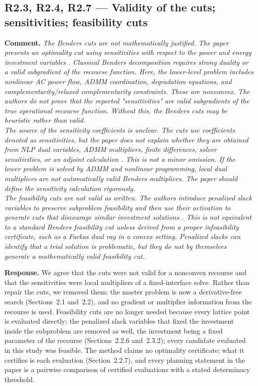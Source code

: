 \documentclass[11pt]{article}
\newcommand{\rcomment}[1]{\par\medskip\noindent\textbf{Comment.} \textit{#1}\par\smallskip}
\newcommand{\rresponse}[1]{\noindent\textbf{Response.} #1\par\smallskip}
\begin{document}
\subsection*{R2.3, R2.4, R2.7 --- Validity of the cuts; sensitivities; feasibility cuts}
\rcomment{
The Benders cuts are not mathematically justified. The paper presents an optimality cut using sensitivities with respect to the power and energy investment variables . Classical Benders decomposition requires strong duality or a valid subgradient of the recourse function. Here, the lower-level problem includes nonlinear AC power flow, ADMM coordination, degradation equations, and complementarity/relaxed complementarity constraints. These are nonconvex. The authors do not prove that the reported "sensitivities" are valid subgradients of the true operational recourse function. Without this, the Benders cuts may be heuristic rather than valid.\\
The source of the sensitivity coefficients is unclear. The cuts use coefficients denoted as sensitivities, but the paper does not explain whether they are obtained from NLP dual variables, ADMM multipliers, finite differences, solver sensitivities, or an adjoint calculation . This is not a minor omission. If the lower problem is solved by ADMM and nonlinear programming, local dual multipliers are not automatically valid Benders multipliers. The paper should define the sensitivity calculation rigorously.\\
The feasibility cuts are not valid as written. The authors introduce penalized slack variables to preserve subproblem feasibility and then use their activation to generate cuts that discourage similar investment solutions . This is not equivalent to a standard Benders feasibility cut unless derived from a proper infeasibility certificate, such as a Farkas dual ray in a convex setting. Penalized slacks can identify that a trial solution is problematic, but they do not by themselves generate a mathematically valid feasibility cut.
}
\rresponse{
    We agree that the cuts were not valid for a nonconvex recourse and that the sensitivities were local multipliers of a fixed-interface solve. Rather than repair the cuts, we removed them: the master problem is now a derivative-free search (Sections~2.1 and~2.2), and no gradient or multiplier information from the recourse is used. Feasibility cuts are no longer needed because every lattice point is evaluated directly; 
    the penalized slack variables that fixed the investment inside the subproblem are removed as well, the investment being a fixed parameter of the recourse (Sections~2.2.6 and~2.3.2);
    every candidate evaluated in this study was feasible. The method claims no optimality certificate; what it certifies is each evaluation (Section~2.2.7), and every planning statement in the paper is a pairwise comparison of certified evaluations with a stated determinacy threshold.
}
\end{document}
